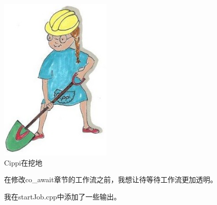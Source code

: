 \begin{center}
\includegraphics[width=0.4\textwidth]{content/3/chapter7/images/18.png}\\
Cippi在挖地
\end{center}

在修改co\_await章节的工作流之前，我想让待等待工作流更加透明。


我在startJob.cpp中添加了一些输出。

